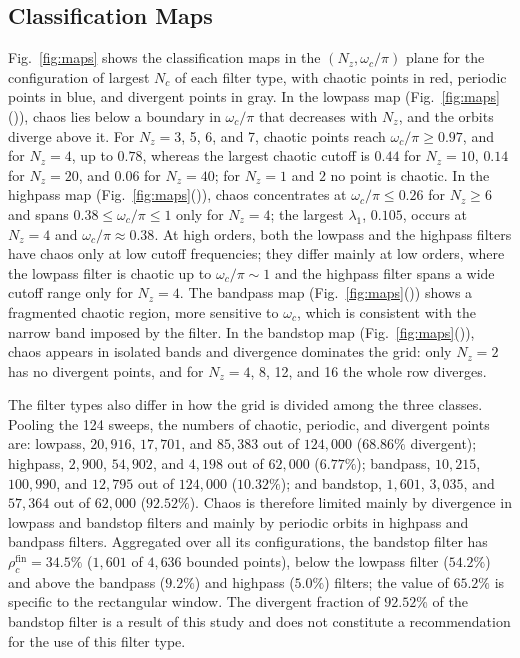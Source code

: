 \documentclass[journal]{IEEEtran}
\begin{document}
\subsection{Classification Maps}\label{sub:maps}
Fig.~\ref{fig:maps} shows the classification maps in
the $(N_z,\omega_c/\pi)$ plane for the configuration of largest $N_c$ of each
filter type, with chaotic points in red, periodic points in blue, and
divergent points in gray. In the lowpass map (Fig.~\ref{fig:maps}()), chaos
lies below a boundary in $\omega_c/\pi$ that decreases with $N_z$, and the
orbits diverge above it. For $N_z = 3$, 5, 6, and 7, chaotic points reach
$\omega_c/\pi\ge0.97$, and for $N_z=4$, up to $0.78$, whereas the largest
chaotic cutoff is $0.44$ for $N_z=10$, $0.14$ for $N_z=20$, and $0.06$ for
$N_z=40$; for $N_z=1$ and $2$ no point is chaotic. In the highpass map
(Fig.~\ref{fig:maps}()), chaos concentrates at $\omega_c/\pi\le0.26$ for
$N_z\ge6$ and spans $0.38\le\omega_c/\pi\le1$ only for $N_z=4$; the largest
$\lambda_1$, $0.105$, occurs at $N_z=4$ and $\omega_c/\pi\approx0.38$. At high orders, both the lowpass and the highpass filters have
chaos only at low cutoff frequencies; they differ mainly at low orders, where
the lowpass filter is chaotic up to $\omega_c/\pi\sim1$ and the highpass filter
spans a wide cutoff range only for $N_z=4$. The bandpass map (Fig.~\ref{fig:maps}()) shows a fragmented
chaotic region, more sensitive to $\omega_c$, which is consistent with the
narrow band imposed by the filter. In the bandstop map
(Fig.~\ref{fig:maps}()), chaos appears in isolated bands and divergence
dominates the grid: only $N_z=2$ has no divergent points, and for $N_z=4$, 8,
12, and 16 the whole row diverges.

The filter types also differ in how the grid is divided among the three
classes. Pooling the 124 sweeps, the numbers of chaotic, periodic, and
divergent points are: lowpass, $20{,}916$, $17{,}701$, and $85{,}383$ out of
$124{,}000$ ($68.86\%$ divergent); highpass, $2{,}900$, $54{,}902$, and
$4{,}198$ out of $62{,}000$ ($6.77\%$); bandpass, $10{,}215$, $100{,}990$, and
$12{,}795$ out of $124{,}000$ ($10.32\%$); and bandstop, $1{,}601$, $3{,}035$,
and $57{,}364$ out of $62{,}000$ ($92.52\%$). Chaos is therefore limited
mainly by divergence in lowpass and bandstop filters and mainly by periodic
orbits in highpass and bandpass filters. %
Aggregated over all its configurations, the bandstop filter has
$\rho_c^{\text{fin}}=34.5\%$ ($1{,}601$ of $4{,}636$ bounded points), below
the lowpass filter ($54.2\%$) and above the bandpass ($9.2\%$) and highpass
($5.0\%$) filters; the value of $65.2\%$ is specific to the rectangular
window. The divergent fraction of $92.52\%$ of the bandstop filter is a result
of this study and does not constitute a recommendation for the use of this
filter type.
\end{document}
